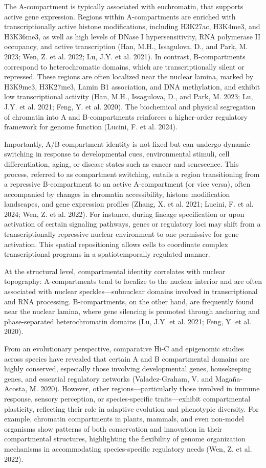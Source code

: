 \documentclass[
  a4paper,
  openany]{scrbook}
\begin{document}
The A-compartment is typically associated with euchromatin, that
supports active gene expression. Regions within A-compartments are
enriched with transcriptionally active histone modifications, including
H3K27ac, H3K4me3, and H3K36me3, as well as high levels of DNase I
hypersensitivity, RNA polymerase II occupancy, and active transcription
(Han, M.H., Issagulova, D., and Park, M. 2023; Wen, Z. et al. 2022; Lu,
J.Y. et al. 2021). In contrast, B-compartments correspond to
heterochromatic domains, which are transcriptionally silent or
repressed. These regions are often localized near the nuclear lamina,
marked by H3K9me3, H3K27me3, Lamin B1 association, and DNA methylation,
and exhibit low transcriptional activity (Han, M.H., Issagulova, D., and
Park, M. 2023; Lu, J.Y. et al. 2021; Feng, Y. et al. 2020). The
biochemical and physical segregation of chromatin into A and
B-compartments reinforces a higher-order regulatory framework for genome
function (Lucini, F. et al. 2024).

Importantly, A/B compartment identity is not fixed but can undergo
dynamic switching in response to developmental cues, environmental
stimuli, cell differentiation, aging, or disease states such as cancer
and senescence. This process, referred to as compartment switching,
entails a region transitioning from a repressive B-compartment to an
active A-compartment (or vice versa), often accompanied by changes in
chromatin accessibility, histone modification landscapes, and gene
expression profiles (Zhang, X. et al. 2021; Lucini, F. et al. 2024; Wen,
Z. et al. 2022). For instance, during lineage specification or upon
activation of certain signaling pathways, genes or regulatory loci may
shift from a transcriptionally repressive nuclear environment to one
permissive for gene activation. This spatial repositioning allows cells
to coordinate complex transcriptional programs in a spatiotemporally
regulated manner.

At the structural level, compartmental identity correlates with nuclear
topography: A-compartments tend to localize to the nuclear interior and
are often associated with nuclear speckles---subnuclear domains involved
in transcriptional and RNA processing. B-compartments, on the other
hand, are frequently found near the nuclear lamina, where gene silencing
is promoted through anchoring and phase-separated heterochromatin
domains (Lu, J.Y. et al. 2021; Feng, Y. et al. 2020).

From an evolutionary perspective, comparative Hi-C and epigenomic
studies across species have revealed that certain A and B compartmental
domains are highly conserved, especially those involving developmental
genes, housekeeping genes, and essential regulatory networks
(Valadez-Graham, V. and Magaña-Acosta, M. 2020). However, other
regions---particularly those involved in immune response, sensory
perception, or species-specific traits---exhibit compartmental
plasticity, reflecting their role in adaptive evolution and phenotypic
diversity. For example, chromatin compartments in plants, mammals, and
even non-model organisms show patterns of both conservation and
innovation in their compartmental structures, highlighting the
flexibility of genome organization mechanisms in accommodating
species-specific regulatory needs (Wen, Z. et al. 2022).
\end{document}
